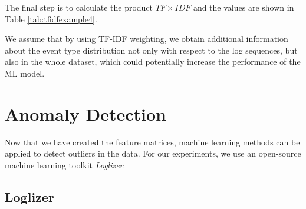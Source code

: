 The final step is to calculate the product $TF \times IDF$ and the values are shown in Table \ref{tab:tfidfexample4}.

\begin{table}[!h]
    \centering
    \caption{TF and IDF scores from the example are multiplied to get TF-IDF.}
    \label{tab:tfidfexample4}
\end{table}

We assume that by using TF-IDF weighting, we obtain additional information about the event type distribution not only with respect to the log sequences, but also in the whole dataset, which could potentially increase the performance of the ML model. 

\section{Anomaly Detection}

Now that we have created the feature matrices, machine learning methods can be applied to detect outliers in the data. For our experiments, we use an open-source machine learning toolkit \textit{Loglizer}. 

\subsection{Loglizer}
\label{subscetion:loglizer}

